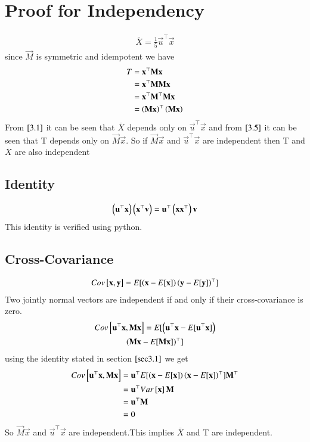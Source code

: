 \documentclass[journal,12pt,twocolumn]{IEEEtran}
\begin{document}
\section{Proof for Independency}
\begin{align}
    \overline{X}=\frac{1}{5}\vec{u}^{\top}\vec{x}\label{3.1}
\end{align}
since $\vec{M}$ is symmetric and idempotent we have
\begin{align}
   T&=\mathbf{x}^{\top}\mathbf{M}\mathbf{x}\\
    &=\mathbf{x}^{\top}\mathbf{M}\mathbf{M}\mathbf{x}\\
    &=\mathbf{x}^{\top}\mathbf{M}^{\top}\mathbf{M}\mathbf{x}\\
    &=\left(\mathbf{M}\mathbf{x}\right)^{\top}\left(\mathbf{M}\mathbf{x}\right)\label{3.5} 
\end{align}
From $\eqref{3.1}$ it can be seen that $\overline{X}$ depends only on $\vec{u}^{\top}\vec{x}$ and from $\eqref{3.5}$ it can be seen that T depends only on $\vec{M}\vec{x}$.
So if $\vec{M}\vec{x}$ and $\vec{u}^{\top}\vec{x}$ are independent then T and $\overline{X}$  are also independent
\subsection{Identity}
\label{sec3.1}
\begin{align}
   \left(\mathbf{u}^{\top}\mathbf{x}\right)\left(\mathbf{x}^{\top}\mathbf{v}\right)=\mathbf{u}^{\top}\left(\mathbf{x}\mathbf{x}^{\top}\right)\mathbf{v}
\end{align}
This identity is verified using python.
\subsection{Cross-Covariance}
\begin{align}
    Cov{}\left[\mathbf{x},\mathbf{y}\right]=E[ \left(\mathbf{x}-E[ \mathbf{x} ]\right)\left(\mathbf{y}-E[ \mathbf{y} ]\right)^{\top} ]
\end{align}
Two jointly normal vectors are independent if and only if their cross-covariance is zero.
\begin{multline}
    Cov{}\left[\mathbf{u}^{\top}\mathbf{x},\mathbf{M}\mathbf{x}\right]=E[ \left(\mathbf{u}^{\top}\mathbf{x}-E[ \mathbf{u}^{\top}\mathbf{x} ]\right)\\\left(\mathbf{M}\mathbf{x}-E[ \mathbf{M}\mathbf{x} ]\right)^{\top} ]
\end{multline}
using the identity stated in section $\ref{sec3.1}$ we get
\begin{align}
 Cov{}\left[\mathbf{u}^{\top}\mathbf{x},\mathbf{M}\mathbf{x}\right]   &=\mathbf{u}^{\top}E[ \left(\mathbf{x}-E[ \mathbf{x} ]\right)\left(\mathbf{x}-E[ \mathbf{x} ]\right)^{\top} ]\mathbf{M}^{\top}\\
    &=\mathbf{u}^{\top}Var{}\left[\mathbf{x}\right]\mathbf{M}\\
    &=\mathbf{u}^{\top}\mathbf{M}\\
    &=0
\end{align}
So $\vec{M}\vec{x}$ and $\vec{u}^{\top}\vec{x}$ are independent.This implies $\overline{X}$ and T are independent.
\end{document}
